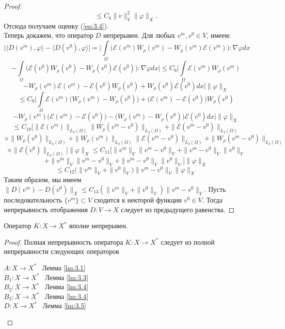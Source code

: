 \begin{proof}
    $$\leqslant C_8\| v\|^2_V\|\varphi\|_X.$$
    Отсюда получаем оценку (\ref{eq:3.4}). \\
    Теперь докажем, что оператор $D$ непрерывен. Для любых $v^m,v^0\in V$, имеем:
    $$\bigg|\langle D(v^m),\varphi\rangle-\langle D(v^0),\varphi\rangle\bigg|=\bigg|\int\limits_{\Omega}\bigg(\mathcal{E}(v^m)W_{\rho}(v^m)-W_{\rho}(v^m)\mathcal{E}(v^m)\bigg):\nabla\varphi dx$$
    $$-\int\limits_{\Omega}\bigg(\mathcal{E}(v^0)W_{\rho}(v^0)-W_{\rho}(v^0)\mathcal{E}(v^0)\bigg):\nabla\varphi dx\bigg|\leqslant C_9\bigg|\int\limits_{\Omega}\mathcal{E}(v^m)W_{\rho}(v^m)$$
    $$-W_{\rho}(v^m)\mathcal{E}(v^m)-\mathcal{E}(v^0)W_{\rho}(v^0)+W_{\rho}(v^0)\mathcal{E}(v^0)dx\bigg|\|\varphi\|_X$$
    $$\leqslant C_9\bigg|\int\limits_{\Omega}\mathcal{E}(v^m)\bigg(W_{\rho}(v^m)-W_{\rho}(v^0)\bigg)+\bigg(\mathcal{E}(v^m)-\mathcal{E}(v^0)\bigg)W_{\rho}(v^0)$$
    $$-W_{\rho}(v^m)\bigg(\mathcal{E}(v^m)-\mathcal{E}(v^0)\bigg)-\bigg(W_{\rho}(v^m)-W_{\rho}(v^0)\bigg)\mathcal{E}(v^0)dx\bigg|\|\varphi\|_X$$
    $$\leqslant C_{10}\bigg[\|\mathcal{E}(v^m)\|_{L_2(\Omega)}\|W_{\rho}(v^m-v^0)\|_{L_2(\Omega)}+\|\mathcal{E}(v^m-v^0)\|_{L_2(\Omega)}$$
    $$\times\|W_{\rho}(v^0)\|_{L_2(\Omega)}+\|W_{\rho}(v^m)\|_{L_2(\Omega)}\|\mathcal{E}(v^m-v^0)\|_{L_2(\Omega)}+\|W_{\rho}(v^m-v^0)\|_{L_2(\Omega)}$$
    $$\times\|\mathcal{E}(v^0)\|_{L_2(\Omega)}\bigg]\|\varphi\|_X\leqslant C_{11}\bigg[\|v^m\|_V\|v^m-v^0\|_V+\|v^m-v^0\|_V\|v^0\|_V$$
    $$+\|v^m\|_V\|v^m-v^0\|_V+\|v^m-v^0\|_V\|v^0\|_V\bigg]\|\varphi\|_X$$
    $$\leqslant C_{12}\bigg(\|v^m\|_V+\|v^0\|_V\bigg)\|v^m-v^0\|_V\|\varphi\|_X$$
    Таким образом, мы имеем $\|D(v^m)-D(v^0)\|_X\leqslant C_{13}(\|v^m\|_V+\|v^0\|_V)\|v^m-v^0\|_V$.
    Пусть последовательность $\{v^m\}\subset V$ сходится к некторой функции $v^0\in V$. Тогда непрерывность отображения $D:V\rightarrow X$
    следует из предыдущего равенства.
\end{proof}

\begin{lemma}\label{lm:3.6}
    Оператор $K:X\rightarrow X^*$ вполне непрерывен.
\end{lemma}

\begin{proof}
    Полная непрерывность оператора $K:X\rightarrow X^*$ следует из полной непрерывности следующих операторов
    \begin{center}
        $A:X\rightarrow X^*$ \ Лемма \ref{lm:3.1} \\
        $B_1:X\rightarrow X^*$ \ Лемма \ref{lm:3.3} \\
        $B_2:X\rightarrow X^*$ \ Лемма \ref{lm:3.4} \\
        $B_3:X\rightarrow X^*$ \ Лемма \ref{lm:3.4} \\
        $D:X\rightarrow X^*$ \ Лемма \ref{lm:3.5} \\
    \end{center}
\end{proof}

